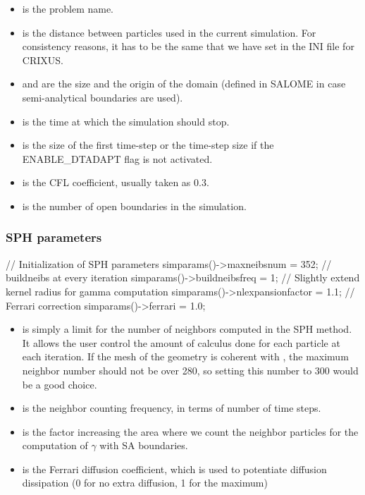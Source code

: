 \documentclass{../GPUSPHtemplate}
\begin{document}
\begin{itemize}
\item {} is the problem name.

\item {} is the distance between particles used in the current simulation. 
For consistency reasons, it has to be the same that we have set in the INI file for CRIXUS.

\item {} and  are the size and the origin of the domain 
(defined in SALOME in case semi-analytical boundaries are used).

\item {} is the time at which the simulation should stop.

\item {} is the size of the first time-step or the time-step size if the ENABLE\_DTADAPT
flag is not activated.

\item {} is the CFL coefficient, usually taken as 0.3.

\item {} is the number of open boundaries in the simulation.
\end{itemize}

\subsubsection{SPH parameters}
\begin{ccode}
// Initialization of SPH parameters
simparams()->maxneibsnum = 352;
// buildneibs at every iteration
simparams()->buildneibsfreq = 1;
// Slightly extend kernel radius for gamma computation
simparams()->nlexpansionfactor = 1.1;
// Ferrari correction
simparams()->ferrari = 1.0;
\end{ccode}
\begin{itemize}
\item {} is simply a limit for the number of neighbors computed 
in the SPH method. It allows the user control the amount of calculus 
done for each particle at each iteration. If the mesh of the geometry 
is coherent with , the maximum neighbor number should not be over 280, 
so setting this number to 300 would be a good choice.
\item {} is the neighbor counting frequency, 
in terms of number of time steps.
\item {} is the factor increasing the area 
where we count the neighbor particles
for the computation of $\gamma$ with SA boundaries.
\item {} is the Ferrari diffusion coefficient, which is used 
to potentiate diffusion dissipation (0 for no extra diffusion, 1 for the maximum)
\end{itemize}
\end{document}
